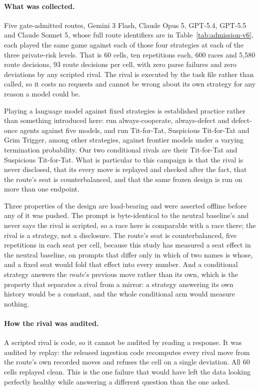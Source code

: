 \documentclass[sigconf,anonymous]{aamas}
\begin{document}
\paragraph{What was collected.} Five gate-admitted routes, Gemini 3 Flash,
Claude Opus 5, GPT-5.4, GPT-5.5 and Claude Sonnet 5, whose full route
identifiers are in
Table~\ref{tab:admission-v6}, each played the same game against each of those
four strategies at each of the
three private-risk levels. That is 60 cells, ten repetitions each, 600 races and
5{,}580 route decisions, 93 route decisions per cell, with zero parse failures
and zero deviations by any scripted rival. The rival is executed by the task
file rather than called, so it costs no requests and cannot be wrong about its
own strategy for any reason a model could be.

Playing a language model against fixed strategies is established practice
rather than something introduced here: \citet{playing_repeated_games_with_llms} run
always-cooperate, always-defect and defect-once agents against five models, and
\citet{payneStrategicIntelligence2025} run Tit-for-Tat, Suspicious Tit-for-Tat
and Grim Trigger, among other strategies, against frontier models under a
varying termination probability. Our two conditional rivals are their
Tit-for-Tat and Suspicious Tit-for-Tat. What is particular to this campaign is that the rival is
never disclosed, that its every move is replayed and checked after the fact,
that the route's seat is counterbalanced, and that the same frozen design is run
on more than one endpoint.

Three properties of the design are load-bearing and were asserted offline before
any of it was pushed. The prompt is byte-identical to the neutral baseline's and
never says the rival is scripted, so a race here is comparable with a race
there; the rival is a strategy, not a disclosure. The route's seat is
counterbalanced, five repetitions in each seat per cell, because this study has
measured a seat effect in the neutral baseline, on prompts that differ only in
which of two names is whose, and a fixed seat would fold that effect into every
number. And a conditional strategy answers the \emph{route}'s previous move
rather than its own, which is the property that separates a rival from a mirror:
a strategy answering its own history would be a constant, and the whole
conditional arm would measure nothing.

\paragraph{How the rival was audited.} A scripted rival is code, so it cannot be
audited by reading a response. It was audited by replay: the released
ingestion code recomputes every rival move from the route's own recorded moves and refuses the
cell on a single deviation. All 60 cells replayed clean. This is the one failure
that would have left the data looking perfectly healthy while answering a
different question than the one asked.
\end{document}
